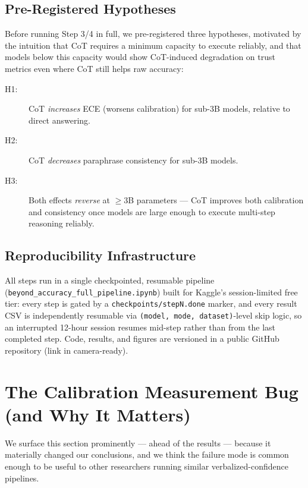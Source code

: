 \documentclass{article}
\begin{document}
\subsection{Pre-Registered Hypotheses}
\label{sec:hypotheses}

Before running Step 3/4 in full, we pre-registered three hypotheses, motivated by the intuition that CoT requires a minimum capacity to execute reliably, and that models below this capacity would show CoT-induced degradation on trust metrics even where CoT still helps raw accuracy:

\begin{description}
    \item[H1:] CoT \emph{increases} ECE (worsens calibration) for sub-3B models, relative to direct answering.
    \item[H2:] CoT \emph{decreases} paraphrase consistency for sub-3B models.
    \item[H3:] Both effects \emph{reverse} at $\geq$3B parameters --- CoT improves both calibration and consistency once models are large enough to execute multi-step reasoning reliably.
\end{description}

\subsection{Reproducibility Infrastructure}

All steps run in a single checkpointed, resumable pipeline (\texttt{beyond\_accuracy\_full\_pipeline.ipynb}) built for Kaggle's session-limited free tier: every step is gated by a \texttt{checkpoints/stepN.done} marker, and every result CSV is independently resumable via \texttt{(model, mode, dataset)}-level skip logic, so an interrupted 12-hour session resumes mid-step rather than from the last completed step. Code, results, and figures are versioned in a public GitHub repository (link in camera-ready).

\section{The Calibration Measurement Bug (and Why It Matters)}
\label{sec:bug}

We surface this section prominently --- ahead of the results --- because it materially changed our conclusions, and we think the failure mode is common enough to be useful to other researchers running similar verbalized-confidence pipelines.
\end{document}
